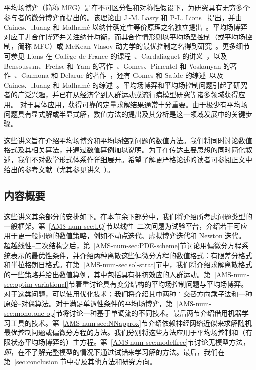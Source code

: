 \documentclass{amsproc}
\theoremstyle{definition}
\theoremstyle{remark}
\numberwithin{equation}{section}
\begin{document}
平均场博弈（简称 MFG）是在不可区分性和对称性假设下，为研究具有无穷多个参与者的微分博弈而提出的。该理论由 J.-M. Lasry 和 P-L. Lions~\cite{MR2269875,MR2271747,MR2295621} 提出，并由 Caines、Huang 和 Malham{\'e} 以纳什确定性等价原理之名独立提出~\cite{MR2346927,MR2352434}。平均场博弈对应于非合作博弈并关注纳什均衡，而其合作情形则以平均场型控制（或平均场控制，简称 MFC）或 McKean-Vlasov 动力学的最优控制之名得到研究~\cite{MR3395471,MR3134900}。更多细节可参见 Lions 在 Coll\`ege de France 的课程~\cite{PLL-CDF}、Cardaliaguet 的讲义~\cite{Cardaliaguet-2013-notes}，以及 Bensoussan、Frehse 和 Yam 的著作~\cite{MR3134900}、Gomes、Pimentel 和 Voskanyan 的著作~\cite{MR3559742}、Carmona 和 Delarue 的著作~\cite{MR3752669,MR3753660}，还有 Gomes 和 Sa{\'u}de 的综述~\cite{MR3195844}以及 Caines、Huang 和 Malham{\'e} 的综述~\cite{CHM-2017-survey}。平均场博弈和平均场控制问题引起了研究者的广泛兴趣，并已在从经济学到人群运动或流行病模型研究等诸多领域获得应用。
对于具体应用，获得可靠的定量求解结果通常十分重要。由于极少有平均场问题具有显式解或半显式解，数值方法的提出及其分析是这一领域发展中的关键步骤。

这些讲义旨在介绍平均场博弈和平均场控制问题的数值方法。我们将同时讨论数值格式及其相关算法，并通过数值算例加以说明。为了在传达主要思想的同时简化叙述，我们不对数学形式体系作详细展开。希望了解更严格论述的读者可参阅正文中给出的参考文献（尤其参见讲义~\cite{MR3135339,achdoulauriere-2020-mfg-numerical}）。





\subsection{内容概要}

这些讲义其余部分的安排如下。在本节余下部分中，我们将介绍所考虑问题类型的一般框架。第~\ref{AMS-num-sec:LQ}节以线性--二次问题为试验平台，介绍若干可应用于更一般问题的数值策略，例如不动点迭代、虚拟博弈迭代和 Newton 迭代。超越线性--二次结构之后，第~\ref{AMS-num-sec:PDE-scheme}节讨论用偏微分方程系统表示的最优性条件，并介绍两种离散这些偏微分方程的数值格式：有限差分格式和半拉格朗日格式。在第~\ref{AMS-num-sec:sol-strat}节中，我们将介绍求解离散格式的一些策略并给出数值算例，其中包括具有拥挤效应的人群运动。第~\ref{AMS-num-sec:optim-variational}节着重讨论具有变分结构的平均场控制问题与平均场博弈。对于这类问题，可以使用优化技术；我们将介绍其中两种：交替方向乘子法和一种原始--对偶算法。对于满足单调性条件的平均场博弈，第~\ref{AMS-num-sec:monotone-op}节将讨论一种基于单调流的不同技术。最后两节介绍借用机器学习工具的技术。第~\ref{AMS-num-sec:NNapprox}节介绍依赖神经网络近似来求解随机最优控制问题或偏微分方程的方法。我们分别将这些方法应用于平均场控制和（有限状态平均场博弈的）主方程。第~\ref{AMS-num-sec:modelfree}节讨论无模型方法，\textit{即}，在不了解完整模型的情况下通过试错来学习解的方法。最后，我们在第~\ref{sec:conclusion}节中提及其他方法和研究方向。
\end{document}

